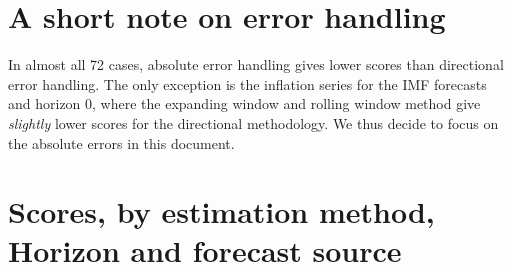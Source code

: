 \documentclass[
]{article}
\begin{document}
\hypertarget{a-short-note-on-error-handling}{%
\section{A short note on error handling}\label{a-short-note-on-error-handling}}

In almost all 72 cases, absolute error handling gives lower scores than directional error handling. The only exception is the inflation series for the IMF forecasts and horizon 0, where the expanding window and rolling window method give \textit{slightly} lower scores for the directional methodology.
We thus decide to focus on the absolute errors in this document.

\hypertarget{scores-by-estimation-method-horizon-and-forecast-source}{%
\section{Scores, by estimation method, Horizon and forecast source}\label{scores-by-estimation-method-horizon-and-forecast-source}}
\end{document}
